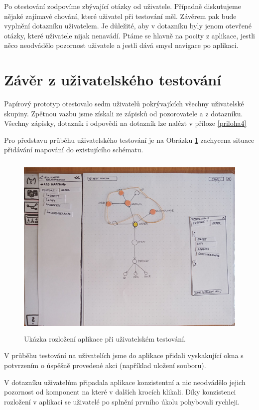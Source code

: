 Po otestování zodpovíme zbývající otázky od uživatele. Případně diskutujeme nějaké zajímavé chování, které uživatel při testování měl. Závěrem pak bude vyplnění dotazníku uživatelem. Je důležité, aby v dotazníku byly jenom otevřené otázky, které uživatele nijak nenavádí. Ptáme se hlavně na pocity z aplikace, jestli něco neodvádělo pozornost uživatele a jestli dává smysl navigace po aplikaci.

\section{Závěr z uživatelského testování}

Papírový prototyp otestovalo sedm uživatelů pokrývajících všechny uživatelské skupiny. Zpětnou vazbu jsme získali ze zápisků od pozorovatele a z dotazníku. Všechny zápisky, dotazník i odpovědi na dotazník lze nalézt v příloze \ref{priloha4}

Pro představu průběhu uživatelského testování je na Obrázku \ref{obr05:ukazka-testovani} zachycena situace přidávání mapování do existujícího schématu.

\begin{figure}[htb]
  \centering
  \includegraphics[height=90mm]{../img/ukazka-testovani}
  \caption{Ukázka rozložení aplikace při uživatelském testování.}
  \label{obr05:ukazka-testovani}
\end{figure}

V průběhu testování na uživatelích jsme do aplikace přidali vyskakující okna s potvrzením o úspěšně provedené akci (například uložení souboru).

V dotazníku uživatelům připadala aplikace konzistentní a nic neodvádělo jejich pozornost od komponent na které v dalších krocích klikali. Díky konzistenci rozložení v aplikaci se uživatelé po splnění prvního úkolu pohybovali rychleji.

